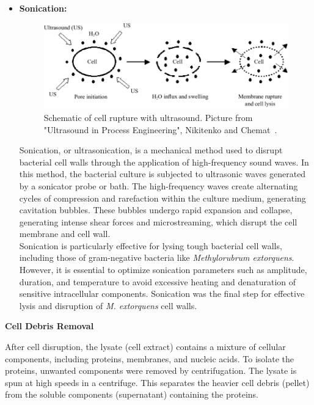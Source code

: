 \begin{itemize}
    \newpage
    \item \textbf{Sonication:} \\
    \begin{figure}[H]
        \centering
        \includegraphics[width=1\textwidth]{./media/images/ultrasound_cell}
        \caption{Schematic of cell rupture with ultrasound. Picture from "Ultrasound in Process Engineering", Nikitenko and Chemat~\cite{ultrasoundcell}.}
        \label{fig:ultrasound_cell}
    \end{figure}
    Sonication, or ultrasonication, is a mechanical method used to disrupt bacterial cell
    walls through the application of high-frequency sound waves.
    In this method, the bacterial culture is subjected to ultrasonic waves generated by a sonicator probe or bath.
    The high-frequency waves create alternating cycles of compression and rarefaction within the culture medium, generating cavitation bubbles.
    These bubbles undergo rapid expansion and collapse, generating intense shear forces and
    microstreaming, which disrupt the cell membrane and cell wall. \\
    Sonication is particularly effective for lysing tough bacterial cell walls, including those of gram-negative bacteria like \emph{Methylorubrum extorquens}.
    However, it is essential to optimize sonication parameters such as amplitude, duration, and temperature to avoid excessive heating and denaturation of sensitive intracellular components.
    Sonication was the final step for effective lysis and disruption of \emph{M. extorquens} cell walls.
\end{itemize}

\textbf{Cell Debris Removal}

After cell disruption, the lysate (cell extract) contains a mixture of cellular components,
including proteins, membranes, and nucleic acids.
To isolate the proteins, unwanted components were removed by centrifugation.
The lysate is spun at high speeds in a centrifuge.
This separates the heavier cell debris (pellet) from the soluble components
(supernatant) containing the proteins.

